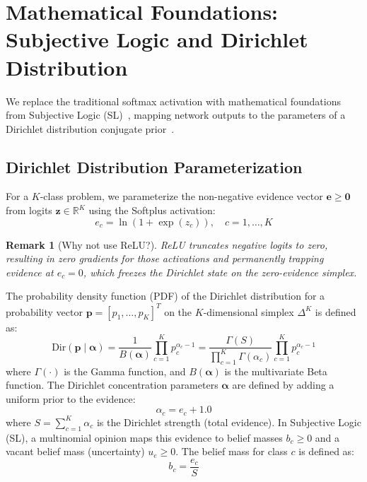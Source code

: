 \documentclass[letterpaper]{article} %
\newcommand{\Dir}{\text{Dir}}
\newcommand{\R}{\mathbb{R}}
\newtheorem{remark}{Remark}
\begin{document}
\section{Mathematical Foundations: Subjective Logic and Dirichlet Distribution}\label{sec:math}

We replace the traditional softmax activation with mathematical foundations from Subjective Logic (SL)~\cite{josang2016subjective}, mapping network outputs to the parameters of a Dirichlet distribution conjugate prior~\cite{sensoy2018evidential}.

\subsection{Dirichlet Distribution Parameterization}
For a $K$-class problem, we parameterize the non-negative evidence vector $\bm{e} \ge \bm{0}$ from logits $\bm{z} \in \R^K$ using the Softplus activation:
\begin{equation}\label{eq:softplus}
    e_c = \ln(1 + \exp(z_c)), \quad c = 1, \ldots, K
\end{equation}
\begin{remark}[Why not use ReLU?]
ReLU truncates negative logits to zero, resulting in zero gradients for those activations and permanently trapping evidence at $e_c = 0$, which freezes the Dirichlet state on the zero-evidence simplex.
\end{remark}
The probability density function (PDF) of the Dirichlet distribution for a probability vector $\bm{p} = [p_1, \dots, p_K]^T$ on the $K$-dimensional simplex $\Delta^K$ is defined as:
\begin{equation}\label{eq:dirichlet_pdf}
    \Dir(\bm{p} \mid \bm{\alpha}) = \frac{1}{B(\bm{\alpha})} \prod_{c=1}^K p_c^{\alpha_c - 1} = \frac{\Gamma(S)}{\prod_{c=1}^K \Gamma(\alpha_c)} \prod_{c=1}^K p_c^{\alpha_c - 1}
\end{equation}
where $\Gamma(\cdot)$ is the Gamma function, and $B(\bm{\alpha})$ is the multivariate Beta function. The Dirichlet concentration parameters $\bm{\alpha}$ are defined by adding a uniform prior to the evidence:
\begin{equation}\label{eq:alpha}
    \alpha_c = e_c + 1.0
\end{equation}
where $S = \sum_{c=1}^K \alpha_c$ is the Dirichlet strength (total evidence). In Subjective Logic (SL), a multinomial opinion maps this evidence to belief masses $b_c \ge 0$ and a vacant belief mass (uncertainty) $u_e \ge 0$. The belief mass for class $c$ is defined as:
\begin{equation}\label{eq:belief}
    b_c = \frac{e_c}{S}
\end{equation}
\end{document}
